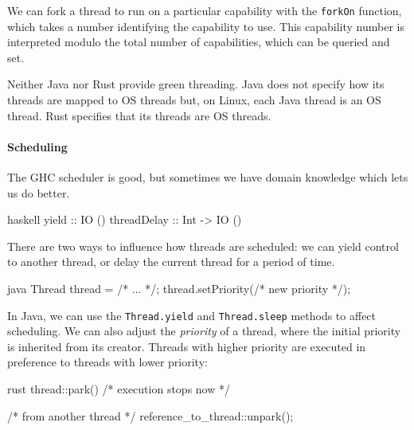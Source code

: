 We can fork a thread to run on a particular capability with the
\verb|forkOn| function, which takes a number identifying the
capability to use.  This capability number is interpreted modulo the
total number of capabilities, which can be queried and set.

Neither Java nor Rust provide green threading.  Java does not specify
how its threads are mapped to OS threads but, on Linux, each Java
thread is an OS thread.  Rust specifies that its threads are OS
threads.

\paragraph{Scheduling}
The GHC scheduler is good, but sometimes we have domain knowledge
which lets us do better.

\begin{listing}
\centering
\begin{cminted}{haskell}
yield       :: IO ()
threadDelay :: Int -> IO ()
\end{cminted}
\caption{Controlling thread scheduling in Haskell.}\label{lst:schedule_haskell}
\end{listing}

There are two ways to influence how threads are scheduled: we can
yield control to another thread, or delay the current thread for a
period of time.

\begin{listing}
\centering
\begin{cminted}{java}
Thread thread = /* ... */;
thread.setPriority(/* new priority */);
\end{cminted}
\caption{Thread priority in Java.}\label{lst:schedule_java}
\end{listing}

In Java, we can use the \verb|Thread.yield| and \verb|Thread.sleep|
methods to affect scheduling.  We can also adjust the \emph{priority}
of a thread, where the initial priority is inherited from its creator.
Threads with higher priority are executed in preference to threads
with lower priority:

\begin{listing}[h!]
\centering
\begin{cminted}{rust}
thread::park() /* execution stops now */

/* from another thread */
reference_to_thread::unpark();
\end{cminted}
\caption{Thread parking and unparking in Rust.}\label{lst:schedule_rust}
\end{listing}

